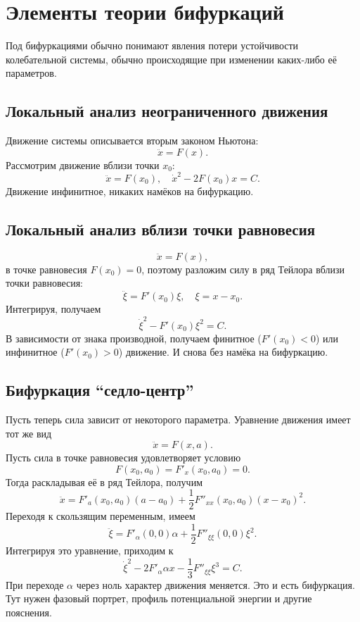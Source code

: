 \section{Элементы теории бифуркаций}

Под бифуркациями обычно понимают явления потери устойчивости колебательной
системы, обычно происходящие при изменении каких-либо её параметров.

\subsection{Локальный анализ неограниченного движения}
Движение системы описывается вторым законом Ньютона:
\[
    \ddot{x} = F(x).
\]
Рассмотрим движение вблизи точки \( x_0 \):
\[
    \ddot{x} = F(x_0),\quad \dot{x}^2 - 2F(x_0)x = C.
\]
Движение инфинитное, никаких намёков на бифуркацию.

\subsection{Локальный анализ вблизи точки равновесия}
\[
    \ddot{x} = F(x),
\]
в точке равновесия \( F(x_0) = 0 \), поэтому разложим силу в ряд Тейлора вблизи
точки равновесия:
\[
    \ddot{\xi} = F'(x_0)\xi,\quad \xi = x - x_0.
\]
Интегрируя, получаем
\[
    \dot{\xi}^2 - F'(x_0)\xi^2 = C.
\]
В зависимости от знака производной, получаем финитное (\( F'(x_0) < 0 \)) или
инфинитное (\( F'(x_0) > 0 \)) движение. И снова без намёка на бифуркацию.

\subsection{Бифуркация ``седло-центр''}
Пусть теперь сила зависит от некоторого параметра. Уравнение движения имеет тот
же вид
\[
    \ddot{x} = F(x, a).
\]
Пусть сила в точке равновесия удовлетворяет условию
\[
    F(x_0, a_0) = F'_x(x_0, a_0) = 0.
\]
Тогда раскладывая её в ряд Тейлора, получим
\[
    \ddot{x} = F'_a(x_0, a_0)(a-a_0) + \frac{1}{2}F''_{xx}(x_0, a_0)(x-x_0)^2.
\]
Переходя к скользящим переменным, имеем
\[
    \ddot{\xi} = F'_\alpha(0, 0)\alpha + \frac{1}{2}F''_{\xi\xi}(0,0)\xi^2.
\]
Интегрируя это уравнение, приходим к
\[
    \dot{\xi}^2 - 2F'_\alpha \alpha x - \frac{1}{3}F''_{\xi\xi}\xi^3 = C.
\]
При переходе \( \alpha \) через ноль характер движения меняется. Это и есть
бифуркация. Тут нужен фазовый портрет, профиль потенциальной энергии и другие
пояснения.
